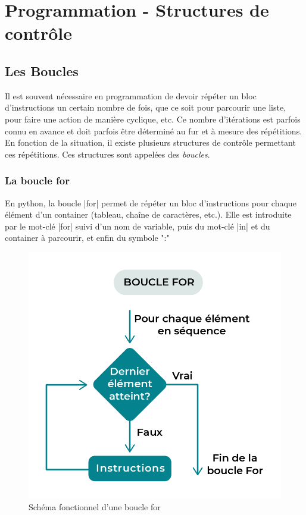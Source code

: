 \documentclass[11pt, a4paper]{book}
\begin{document}
\setcounter{chapter}{7}
\chapter{Programmation - Structures de contrôle}



\section{Les Boucles}
Il est souvent nécessaire en programmation de devoir répéter un bloc d'instructions un certain nombre de fois, que ce soit pour parcourir une liste, pour faire une action de manière cyclique, etc. Ce nombre d'itérations est parfois connu en avance et doit parfois être déterminé au fur et à mesure des répétitions. En fonction de la situation, il existe plusieurs structures de contrôle permettant ces répétitions. Ces structures sont appelées des \textit{boucles}.


\subsection{La boucle \textsf{for}}

\begin{defi} En python, la boucle |for| permet de répéter un bloc d'instructions pour chaque élément d'un container (tableau, chaîne de caractères, etc.). Elle est introduite par le mot-clé |for| suivi d'un nom de variable, puis du mot-clé |in| et du container à parcourir, et enfin du symbole ":" 
\end{defi}

\begin{figure}[h]\begin{center}
\includegraphics[scale=.3]{images/for-loop}
\caption{Schéma fonctionnel d'une boucle for}
\end{center}\end{figure}
\end{document}
